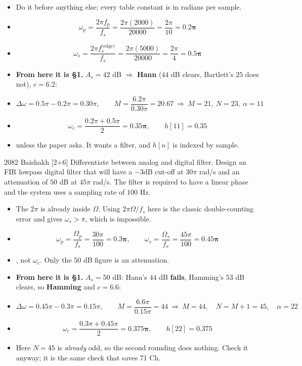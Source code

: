 \begin{itemize}
  \item {} Do it before anything else;
        every table constant is in radians per sample.
  \item[] \[ \omega_p=\frac{2\pi f_p}{f_s}=\frac{2\pi(2000)}{20000}
             =\frac{2\pi}{10}=\mathbf{0.2\pi} \]
  \item[] \[ \omega_s=\frac{2\pi f_s^{\text{(edge)}}}{f_s}=\frac{2\pi(5000)}{20000}
             =\frac{2\pi}{4}=\mathbf{0.5\pi} \]
  \item \textbf{From here it is \S1.} $A_s=42$ dB $\Rightarrow$ \textbf{Hann} ($44$ dB
        clears, Bartlett's $25$ does not), $c=6.2$:
  \item[] \[ \Delta\omega=0.5\pi-0.2\pi=0.30\pi,\qquad
             M=\frac{6.2\pi}{0.30\pi}=20.67\ \Rightarrow\ M=21,\ \boxed{N=23},\
             \alpha=11 \]
  \item[] \[ \omega_c=\frac{0.2\pi+0.5\pi}{2}=\mathbf{0.35\pi},\qquad h[11]=0.35 \]
  \item \mk{Do not convert $\omega_c$ back to Hz} unless the paper asks. It wants a
        filter, and $h[n]$ is indexed by sample.
\end{itemize}

\begin{asked}{2082 Baishakh \textperiodcentered{} [2+6]}
Differentiate between analog and digital filter. Design an FIR lowpass digital filter
that will have a $-3$dB cut-off at $30\pi$ rad/s and an attenuation of $50$ dB at $45\pi$
rad/s. The filter is required to have a linear phase and the system uses a sampling rate
of $100$ Hz.
\end{asked}

\begin{itemize}
  \item {} The
        $2\pi$ is already inside $\Omega$. Using $2\pi\Omega/f_s$ here is the classic
        double-counting error and gives $\omega_s>\pi$, which is impossible.
  \item[] \[ \omega_p=\frac{\Omega_p}{f_s}=\frac{30\pi}{100}=\mathbf{0.3\pi},\qquad
             \omega_s=\frac{\Omega_s}{f_s}=\frac{45\pi}{100}=\mathbf{0.45\pi} \]
  \item {}, not
        $\omega_c$. Only the $50$ dB figure is an attenuation.
  \item \textbf{From here it is \S1.} $A_s=50$ dB: Hann's $44$ dB \textbf{fails},
        Hamming's $53$ dB clears, so \textbf{Hamming} and $c=6.6$:
  \item[] \[ \Delta\omega=0.45\pi-0.3\pi=0.15\pi,\qquad
             M=\frac{6.6\pi}{0.15\pi}=44\ \Rightarrow\ M=44,\quad N=M+1=\boxed{45},\quad
             \alpha=22 \]
  \item[] \[ \omega_c=\frac{0.3\pi+0.45\pi}{2}=\mathbf{0.375\pi},\qquad h[22]=0.375 \]
  \item Here $N=45$ is \emph{already} odd, so the second rounding does nothing. Check it
        anyway; it is the same check that saves 71 Ch.
\end{itemize}

